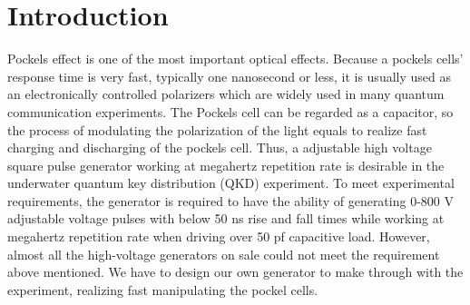 \documentclass[aip,rsi,reprint,graphicx]{revtex4-1} %
\begin{document}
\pacs{}%

\maketitle %


\section{Introduction}
Pockels effect is one of the most important optical effects. Because a pockels cells' response time is very fast, typically one nanosecond or less, it is usually used as an electronically controlled polarizers which are widely used in many quantum communication experiments.
 The Pockels cell can be regarded as a capacitor, so the process of modulating the polarization of the light equals to realize fast charging and discharging of the pockels cell.
 Thus, a adjustable high voltage square pulse generator working at megahertz repetition rate is desirable in the underwater quantum key distribution (QKD) experiment. 
 To meet experimental requirements, the generator is required to have the ability of generating 0-800 V adjustable voltage pulses with below 50 ns rise and fall times while working at megahertz repetition rate when driving over 50 pf capacitive load.
 However, almost all the high-voltage generators on sale could not meet the requirement above mentioned. We have to design our own generator to make through with the experiment, realizing fast manipulating the pockel cells. 
\end{document}
